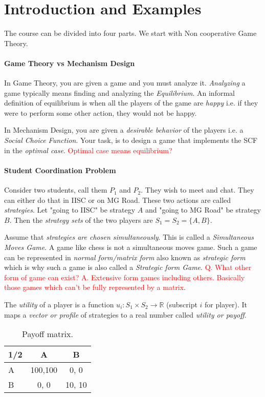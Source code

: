 \section{Introduction and Examples}
The course can be divided into four parts. We start with Non cooperative Game Theory.

\paragraph{Game Theory vs Mechanism Design}
In Game Theory, you are given a game and you must analyze it. \textit{Analyzing} a game typically means finding and analyzing the \textit{Equilibrium}. An informal definition of equilibrium is when all the players of the game are \textit{happy} i.e. if they were to perform some other action, they would not be happy. 

In Mechanism Design, you are given a \textit{desirable behavior} of the players i.e. a \textit{Social Choice Function}. Your task, is to design a game that implements the SCF in the \textit{optimal case}. \textcolor{red}{Optimal case means equilibrium?}

\paragraph{Student Coordination Problem}
Consider two students, call them $P_1$ and $P_2$. They wish to meet and chat. They can either do that in IISC or on MG Road. These two actions are called \textit{strategies}. Let "going to IISC" be strategy $A$ and "going to MG Road" be strategy $B$. Then the \textit{strategy sets} of the two players are $S_1 = S_2 = \{A, B\}$. 

Assume that \textit{strategies are chosen simultaneously}. This is called a \textit{Simultaneous Moves Game}. A game like chess is not a simultaneous moves game. Such a game can be represented in \textit{normal form/matrix form} also known as \textit{strategic form} which is why such a game is also called a \textit{Strategic form Game}. \textcolor{red}{Q. What other form of game can exist? A. Extensive form games including others. Basically those games which can't be fully represented by a matrix}.

The \textit{utility} of a player is a function $u_i: S_1 \times S_2 \to \mathbb{R}$ (subscript $i$ for player). It maps a \textit{vector or profile} of strategies to a real number called \textit{utility or payoff}. 

\begin{wraptable}{r}{5cm}
	\begin{tabular}{lcc}
		\toprule
		1/2 & A & B\\
		\midrule
		A & 100,100 & 0, 0 \\
		B & 0, 0    & 10, 10\\
		\bottomrule
	\end{tabular}
	\caption{Payoff matrix.}
\end{wraptable}

